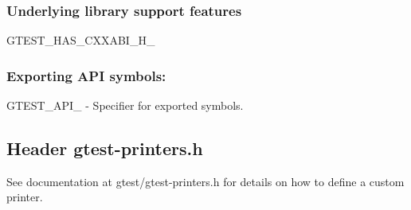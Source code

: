 \subsubsection*{Underlying library support features}


\begin{DoxyItemize}
\item {\ttfamily G\+T\+E\+S\+T\+\_\+\+H\+A\+S\+\_\+\+C\+X\+X\+A\+B\+I\+\_\+\+H\+\_\+}
\end{DoxyItemize}

\subsubsection*{Exporting A\+PI symbols\+:}


\begin{DoxyItemize}
\item {\ttfamily G\+T\+E\+S\+T\+\_\+\+A\+P\+I\+\_\+} -\/ Specifier for exported symbols.
\end{DoxyItemize}

\subsection*{Header {\ttfamily gtest-\/printers.\+h}}


\begin{DoxyItemize}
\item See documentation at {\ttfamily gtest/gtest-\/printers.\+h} for details on how to define a custom printer. 
\end{DoxyItemize}